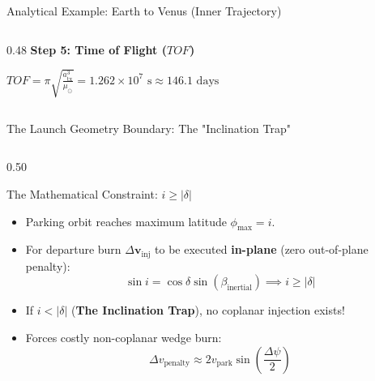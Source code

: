 \documentclass[aspectratio=169, 10pt]{beamer}
\begin{document}
\begin{frame}{Analytical Example: Earth to Venus (Inner Trajectory)}
\begin{columns}[t]
\begin{column}{0.48\textwidth}
            \vspace{0.06cm}
            \textbf{Step 5: Time of Flight ($TOF$)}
            \par\vspace{1pt}
            $TOF = \pi \sqrt{\frac{a_{\text{tx}}^3}{\mu_\odot}} = 1.262 \times 10^7\text{ s} \approx \mathbf{146.1}\text{ days}$
        \end{column}
    \end{columns}
\end{frame}

\begin{frame}{The Launch Geometry Boundary: The "Inclination Trap"}
    \begin{columns}[t]
        \begin{column}{0.50\textwidth}
            \begin{alertblock}{The Mathematical Constraint: $i \ge |\delta|$}
                \scriptsize
                \begin{itemize}\setlength{\itemsep}{1.5pt}
                    \item Parking orbit reaches maximum latitude $\phi_{\max} = i$.
                    \item For departure burn $\Delta \mathbf{v}_{\text{inj}}$ to be executed \textbf{in-plane} (zero out-of-plane penalty):
                    \vspace{-0.05cm}
                    \begin{equation*}
                        \sin i = \cos \delta \sin(\beta_{\text{inertial}}) \implies i \ge |\delta|
                    \end{equation*}
                    \vspace{-0.15cm}
                    \item If $i < |\delta|$ (\textbf{The Inclination Trap}), no coplanar injection exists!
                    \item Forces costly non-coplanar wedge burn:
                    \vspace{-0.05cm}
                    \begin{equation*}
                        \Delta v_{\text{penalty}} \approx 2 v_{\text{park}} \sin\left(\frac{\Delta \psi}{2}\right)
                    \end{equation*}
                \end{itemize}
            \end{alertblock}
        \end{column}


\end{columns}
\end{frame}
\end{document}
